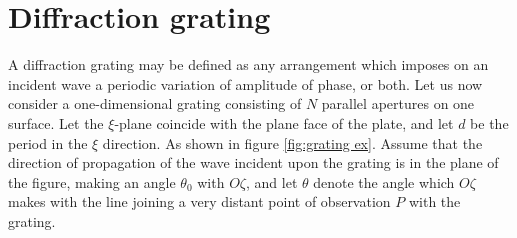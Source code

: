 \documentclass[12pt,twoside,english]{book}
\renewcommand{\~}{\perispomeni}%
\numberwithin{equation}{section}
\numberwithin{figure}{section}
\begin{document}
\section{Diffraction grating}
\label{section:Diffraction-grating}
A diffraction grating may be defined as any arrangement which imposes on an incident wave a periodic variation of amplitude of phase, or both.
Let us now consider a one-dimensional grating consisting of $N$ parallel apertures on one surface. Let the $\xi$-plane coincide with the plane face of the plate, and let $d$ be the period in the $\xi$ direction. As shown in figure \ref{fig:grating ex}. Assume that the direction of propagation of the wave incident upon the grating is in the plane of the figure, making an angle $\theta_{0}$ with $O\zeta$, and let $\theta$ denote the angle which $O\zeta$ makes with the line joining a very distant point of observation $P$ with the grating.
\end{document}
